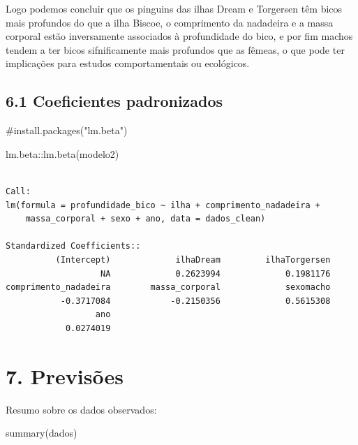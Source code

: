 \documentclass[
  letterpaper,
  DIV=11,
  numbers=noendperiod]{scrartcl}
\newenvironment{Shaded}{\begin{snugshade}}{\end{snugshade}}
\newcommand{\CommentTok}[1]{\textcolor[rgb]{0.37,0.37,0.37}{#1}}
\newcommand{\FunctionTok}[1]{\textcolor[rgb]{0.28,0.35,0.67}{#1}}
\newcommand{\NormalTok}[1]{\textcolor[rgb]{0.00,0.23,0.31}{#1}}
\newcommand{\SpecialCharTok}[1]{\textcolor[rgb]{0.37,0.37,0.37}{#1}}
\begin{document}
Logo podemos concluir que os pinguins das ilhas Dream e Torgersen têm
bicos mais profundos do que a ilha Biscoe, o comprimento da nadadeira e
a massa corporal estão inversamente associados à profundidade do bico, e
por fim machos tendem a ter bicos sifnificamente mais profundos que as
fêmeas, o que pode ter implicações para estudos comportamentais ou
ecológicos.

\subsection{6.1 Coeficientes
padronizados}\label{coeficientes-padronizados}

\begin{Shaded}
\begin{Highlighting}[]
\CommentTok{\#install.packages("lm.beta")}

\NormalTok{lm.beta}\SpecialCharTok{::}\FunctionTok{lm.beta}\NormalTok{(modelo2)}
\end{Highlighting}
\end{Shaded}

\begin{verbatim}

Call:
lm(formula = profundidade_bico ~ ilha + comprimento_nadadeira + 
    massa_corporal + sexo + ano, data = dados_clean)

Standardized Coefficients::
          (Intercept)             ilhaDream         ilhaTorgersen 
                   NA             0.2623994             0.1981176 
comprimento_nadadeira        massa_corporal             sexomacho 
           -0.3717084            -0.2150356             0.5615308 
                  ano 
            0.0274019 
\end{verbatim}

\section{7. Previsões}\label{previsuxf5es}

Resumo sobre os dados observados:

\begin{Shaded}
\begin{Highlighting}[]
\FunctionTok{summary}\NormalTok{(dados)}
\end{Highlighting}
\end{Shaded}
\end{document}
